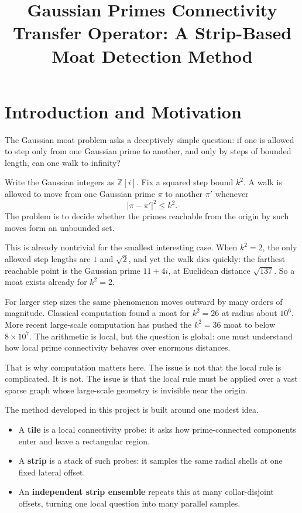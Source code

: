 \documentclass[12pt,letterpaper]{article}
\title{Gaussian Primes Connectivity Transfer Operator: A Strip-Based Moat Detection Method}
\author{}
\date{}
\theoremstyle{definition}
\theoremstyle{remark}
\newcommand{\Zi}{\mathbb{Z}[i]}
\begin{document}
\maketitle

\section{Introduction and Motivation}

The Gaussian moat problem asks a deceptively simple question: if one is allowed to step only from one Gaussian prime to another, and only by steps of bounded length, can one walk to infinity?

Write the Gaussian integers as $\Zi$. Fix a squared step bound $k^2$. A walk is allowed to move from one Gaussian prime $\pi$ to another $\pi'$ whenever
\[
|\pi-\pi'|^2 \le k^2.
\]
The problem is to decide whether the primes reachable from the origin by such moves form an unbounded set.

This is already nontrivial for the smallest interesting case. When $k^2=2$, the only allowed step lengths are $1$ and $\sqrt{2}$, and yet the walk dies quickly: the farthest reachable point is the Gaussian prime $11+4i$, at Euclidean distance $\sqrt{137}$. So a moat exists already for $k^2=2$.

For larger step sizes the same phenomenon moves outward by many orders of magnitude. Classical computation found a moat for $k^2=26$ at radius about $10^6$. More recent large-scale computation has pushed the $k^2=36$ moat to below $8\times 10^7$. The arithmetic is local, but the question is global: one must understand how local prime connectivity behaves over enormous distances.

That is why computation matters here. The issue is not that the local rule is complicated. It is not. The issue is that the local rule must be applied over a vast sparse graph whose large-scale geometry is invisible near the origin.

The method developed in this project is built around one modest idea.

\begin{itemize}
\item A \textbf{tile} is a local connectivity probe: it asks how prime-connected components enter and leave a rectangular region.
\item A \textbf{strip} is a stack of such probes: it samples the same radial shells at one fixed lateral offset.
\item An \textbf{independent strip ensemble} repeats this at many collar-disjoint offsets, turning one local question into many parallel samples.
\end{itemize}
\end{document}
